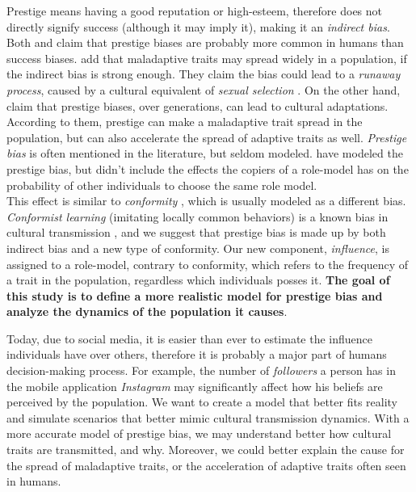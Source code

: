 \documentclass[11pt]{article}
\begin{document}
Prestige means having a good reputation or high-esteem, therefore does not directly signify success (although it may imply it), making it an \textit{indirect bias}.
Both \citet[Ch. 8]{evolutionBook} and \citet{complexityPaper} claim that prestige biases are probably more common in humans than success biases.
\citet[Ch. 8]{evolutionBook} add that maladaptive traits may spread widely in a population, if the indirect bias is strong enough.
They claim the bias could lead to a \textit{runaway process}, caused by a cultural equivalent of \textit{sexual selection} \citep{sexualSelectionBook}.
On the other hand, \citet{henrichBroesch} claim that prestige biases, over generations, can lead to cultural adaptations.
According to them, prestige can make a maladaptive trait spread in the population, but can also accelerate the spread of adaptive traits as well.
\textit{Prestige bias} is often mentioned in the literature, but seldom modeled.
\citet{evolutionBook} have modeled the prestige bias, but didn't include the effects the copiers of a role-model has on the probability of other individuals to choose the same role model.\\
This effect is similar to \textit{conformity} \citep{conformity}, which is usually modeled as a different bias.
\textit{Conformist learning} (imitating locally common behaviors) is a known bias in cultural transmission \citep{conformism}, and we suggest that prestige bias is made up by both indirect bias and a new type of conformity.
Our new component, \textit{influence}, is assigned to a role-model, contrary to conformity, which refers to the frequency of a trait in the population, regardless which individuals posses it.
\textbf{The goal of this study is to define a more realistic model for prestige bias and analyze the dynamics of the population it causes}.
 
Today, due to social media, it is easier than ever to estimate the influence individuals have over others, therefore it is probably a major part of humans decision-making process. For example, the number of \textit{followers} a person has in the mobile application \textit{Instagram} may significantly affect how his beliefs are perceived by the population.
We want to create a model that better fits reality and simulate scenarios that better mimic cultural transmission dynamics.
With a more accurate model of prestige bias, we may understand better how cultural traits are transmitted, and why.
Moreover, we could better explain the cause for the spread of maladaptive traits, or the acceleration of adaptive traits often seen in humans.
\end{document}

